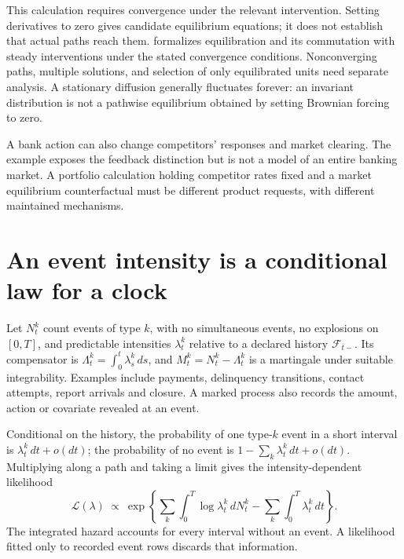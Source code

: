 This calculation requires convergence under the relevant intervention.
Setting derivatives to zero gives candidate equilibrium equations; it
does not establish that actual paths reach them.
\citet[Definition 4.9, Theorems 4.11 and 4.18]{bongers2022}
formalizes equilibration and its commutation with steady interventions
under the stated convergence conditions. Nonconverging paths, multiple
solutions, and selection of only equilibrated units need separate analysis.
A stationary diffusion generally fluctuates forever: an invariant
distribution is not a pathwise equilibrium obtained by setting Brownian
forcing to zero.

A bank action can also change competitors' responses and market clearing.
The example exposes the feedback distinction but is not a model of an
entire banking market. A portfolio calculation holding competitor rates
fixed and a market equilibrium counterfactual must be different product
requests, with different maintained mechanisms.

\section{An event intensity is a conditional law for a clock}
\label{r3:event-intensity}
Let $N^k_t$ count events of type $k$, with no simultaneous events,
no explosions on $[0,T]$, and predictable intensities $\lambda^k_t$
relative to a declared history $\mathcal F_{t-}$.
Its compensator is $\Lambda^k_t=\int_0^t\lambda^k_s\,ds$, and
$M^k_t=N^k_t-\Lambda^k_t$ is a martingale under suitable integrability.
Examples include payments, delinquency transitions, contact attempts,
report arrivals and closure. A marked process also records the amount,
action or covariate revealed at an event.

Conditional on the history, the probability of one type-$k$ event in a
short interval is $\lambda^k_t\,dt+o(dt)$; the probability of no event is
$1-\sum_k\lambda^k_t\,dt+o(dt)$. Multiplying along a path and taking a
limit gives the intensity-dependent likelihood
\[
 \mathcal L(\lambda)\ \propto\
 \exp\left\{\sum_k\int_0^T\log\lambda^k_t\,dN^k_t
                   -\sum_k\int_0^T\lambda^k_t\,dt\right\}.
\]
The integrated hazard accounts for every interval without an event.
A likelihood fitted only to recorded event rows discards that information.

